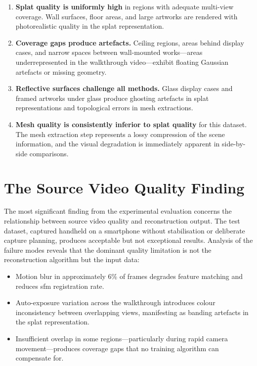 \begin{enumerate}
  \item \textbf{Splat quality is uniformly high} in regions with adequate multi-view coverage. Wall surfaces, floor areas, and large artworks are rendered with photorealistic quality in the splat representation.

  \item \textbf{Coverage gaps produce artefacts.} Ceiling regions, areas behind display cases, and narrow spaces between wall-mounted works---areas underrepresented in the walkthrough video---exhibit floating Gaussian artefacts or missing geometry.

  \item \textbf{Reflective surfaces challenge all methods.} Glass display cases and framed artworks under glass produce ghosting artefacts in splat representations and topological errors in mesh extractions.

  \item \textbf{Mesh quality is consistently inferior to splat quality} for this dataset. The mesh extraction step represents a lossy compression of the scene information, and the visual degradation is immediately apparent in side-by-side comparisons.
\end{enumerate}

\section{The Source Video Quality Finding}
\label{sec:res-video-quality}

The most significant finding from the experimental evaluation concerns the relationship between source video quality and reconstruction output. The test dataset, captured handheld on a smartphone without stabilisation or deliberate capture planning, produces acceptable but not exceptional results. Analysis of the failure modes reveals that the dominant quality limitation is not the reconstruction algorithm but the input data:

\begin{itemize}
  \item Motion blur in approximately 6\% of frames degrades feature matching and reduces \acrshort{sfm} registration rate.
  \item Auto-exposure variation across the walkthrough introduces colour inconsistency between overlapping views, manifesting as banding artefacts in the splat representation.
  \item Insufficient overlap in some regions---particularly during rapid camera movement---produces coverage gaps that no training algorithm can compensate for.
\end{itemize}

